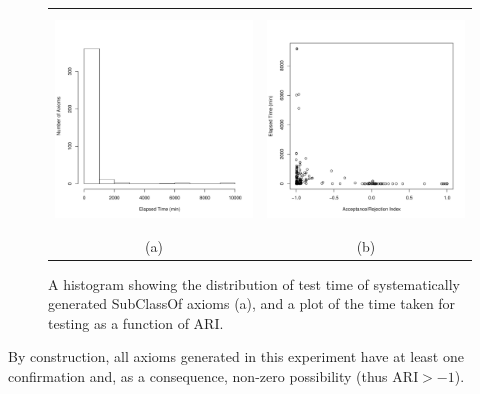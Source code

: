 \documentclass{llncs}
\begin{document}
\begin{figure}[t]
\begin{center}
  \begin{tabular}{cc}
    \includegraphics[height=2.25in]{systematic-time-hist} &
    \includegraphics[height=2.25in]{time-ARI} \\
    (a) & (b)
  \end{tabular}
\end{center}
\caption{A histogram showing the distribution of test time of systematically generated
  \textsf{SubClassOf} axioms (a), and a plot of the time taken
  for testing as a function of ARI.}
\label{fig:systematic-time}
\end{figure}

By construction, all axioms generated in this experiment have at least one confirmation
and, as a consequence, non-zero possibility (thus $\mathrm{ARI} > -1$).
\end{document}
